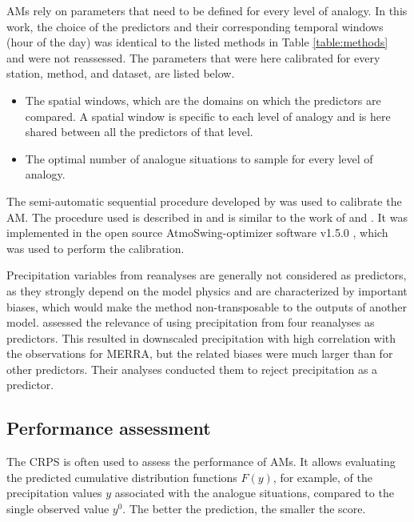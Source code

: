 \documentclass{ametsoc}
\begin{document}
AMs rely on parameters that need to be defined for every level of analogy. In this work, the choice of the predictors and their corresponding temporal windows (hour of the day) was identical to the listed methods in Table \ref{table:methods} and were not reassessed. The parameters that were here calibrated for every station, method, and dataset, are listed below.

\begin{itemize}
	\item The spatial windows, which are the domains on which the predictors are compared. A spatial window is specific to each level of analogy and is here shared between all the predictors of that level.
	\item The optimal number of analogue situations to sample for every level of analogy.
\end{itemize}

The semi-automatic sequential procedure developed by \citet{Bontron2004} was used to calibrate the AM. The procedure used is described in \citet{Horton2017c} and is similar to the work of \citet{Radanovics2013} and \citet{BenDaoud2016}. It was implemented in the open source AtmoSwing-optimizer software v1.5.0 \citep[www.atmoswing.org,][]{Horton2017a}, which was used to perform the calibration.

Precipitation variables from reanalyses are generally not considered as predictors, as they strongly depend on the model physics \citep{Rienecker2011} and are characterized by important biases, which would make the method non-transposable to the outputs of another model. \citet{Dayon2015} assessed the relevance of using precipitation from four reanalyses as predictors. This resulted in downscaled precipitation with high correlation with the observations for MERRA, but the related biases were much larger than for other predictors. Their analyses conducted them to reject precipitation as a predictor.


\subsection{Performance assessment}

The CRPS \citep[Continuous Ranked Probability Score,][]{Brown1974, Matheson1976, Hersbach2000} is often used to assess the performance of AMs. It allows evaluating the predicted cumulative distribution functions $F(y)$, for example, of the precipitation values $y$ associated with the analogue situations, compared to the single observed value $y^{0}$. The better the prediction, the smaller the score.
\end{document}
